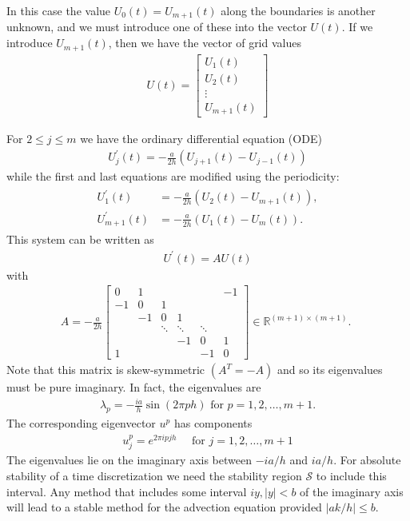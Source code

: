 In this case the value $U_0(t)=U_{m+1}(t)$ along the boundaries is another unknown, and we must introduce one of these into the vector $U(t)$. If we introduce $U_{m+1}(t)$, then we have the vector of grid values
\begin{align*}
U(t)=\left[\begin{array}{c}
U_1(t) \\
U_2(t) \\
\vdots \\
U_{m+1}(t)
\end{array}\right]
\end{align*}

For $2 \leq j \leq m$ we have the ordinary differential equation (ODE)
\begin{align*}
U_j^{\prime}(t)=-\frac{a}{2 h}\left(U_{j+1}(t)-U_{j-1}(t)\right)
\end{align*}
while the first and last equations are modified using the periodicity:
\begin{align*}
\begin{aligned}
U_1^{\prime}(t) & =-\frac{a}{2 h}\left(U_2(t)-U_{m+1}(t)\right), \\
U_{m+1}^{\prime}(t) & =-\frac{a}{2 h}\left(U_1(t)-U_m(t)\right) .
\end{aligned}
\end{align*}
This system can be written as
\begin{align}
    \label{eq: MOL for advect equation LS}
U^{\prime}(t)=A U(t)
\end{align}
with 
\begin{align}
    \label{eq: A of MOL advect eq LS}
A=-\frac{a}{2 h}\left[\begin{array}{cccccc}
0 & 1 & & & & -1 \\
-1 & 0 & 1 & & & \\
& -1 & 0 & 1 & & \\
& & \ddots & \ddots & \ddots & \\
& & & -1 & 0 & 1 \\
1 & & & & -1 & 0
\end{array}\right] \in \mathbb{R}^{(m+1) \times(m+1)} \text {. }
\end{align}
Note that this matrix is skew-symmetric $\left(A^T=-A\right)$ and so its eigenvalues must be pure imaginary. In fact, the eigenvalues are
\begin{align*}
\lambda_p=-\frac{i a}{h} \sin (2 \pi p h) \text { for } p=1,2, \ldots, m+1 .
\end{align*}
The corresponding eigenvector $u^p$ has components
\begin{align*}
u_j^p=e^{2 \pi i p j h} \quad \text { for } j=1,2, \ldots, m+1
\end{align*}
The eigenvalues lie on the imaginary axis between $-i a / h$ and $i a / h$.
For absolute stability of a time discretization we need the stability region $\mathcal{S}$ to include this interval. Any method that includes some interval $i y,|y|<b$ of the imaginary axis will lead to a stable method for the advection equation provided $|a k / h| \leq b$.

